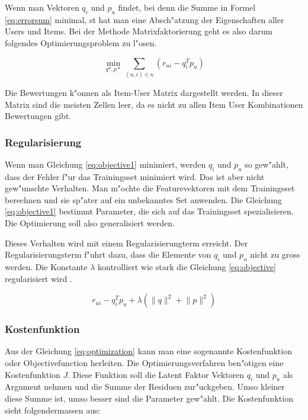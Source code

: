 \documentclass[a4paper, 12pt]{article}
\begin{document}
Wenn man Vektoren $q_i$ und $p_u$ findet, bei denn die Summe in Formel \ref{eq:errorsum} minimal, st hat man eine Absch"atzung der Eigenschaften aller Users und Items. Bei der Methode Matrixfaktorierung geht es also darum folgendes Optimierungsproblem zu l"osen.

\begin{equation}
  \min_{q*,p*} \sum_{(u,i) \in \kappa} (r_{ui} - q_i^T p_u)
  \label{eq:objective1}
\end{equation}

 Die Bewertungen k"onnen als Item-User Matrix dargestellt werden. In dieser Matrix sind die meisten Zellen leer, da es nicht zu allen Item User Kombinationen Bewertungen gibt. 


\subsubsection{Regularisierung}
\label{sec:regularization}

Wenn man Gleichung \ref{eq:objective1} minimiert, werden $q_i$ und $p_u$ so gew"ahlt, dass der Fehler f"ur das Trainingsset minimiert wird. Das ist aber nicht gew"unschte Verhalten. Man m"ochte die Featurevektoren mit dem Trainingsset berechnen und sie sp"ater auf ein unbekanntes Set anwenden. Die Gleichung \ref{eq:objective1} bestimmt Parameter, die sich auf das Trainingsset spezialisieren. Die Optimierung soll also generalisiert werden.

 Dieses Verhalten wird mit einem Regularisierungterm erreicht. Der Regularisierungsterm f"uhrt dazu, dass die Elemente von $q_i$ und $p_u$ nicht zu gross werden. Die Konstante $\lambda$ kontrolliert wie stark die Gleichung \ref{eq:objective} regularisiert wird \cite{koren2009}.

\begin{equation}
  \label{eq:optimization}
    r_{ui} - q_i^T p_u + \lambda (\lVert q \rVert^2 + \lVert p \lVert ^2)
\end{equation}

\subsubsection{Kostenfunktion}
\label{sec:opt}

Aus der Gleichung \ref{eq:optimization} kann man eine sogenannte Kostenfunktion oder Objectivefunction herleiten. Die Optimierungsverfahren ben"otigen eine Kostenfunktion $J$. Diese Funktion soll die Latent Faktor Vektoren $q_i$ und $p_u$ als Argument nehmen und die Summe der Residuen zur"uckgeben. Umso kleiner diese Summe ist, umso besser sind die Parameter gew"ahlt. Die Kostenfunktion sieht folgendermassen aus:
\end{document}
